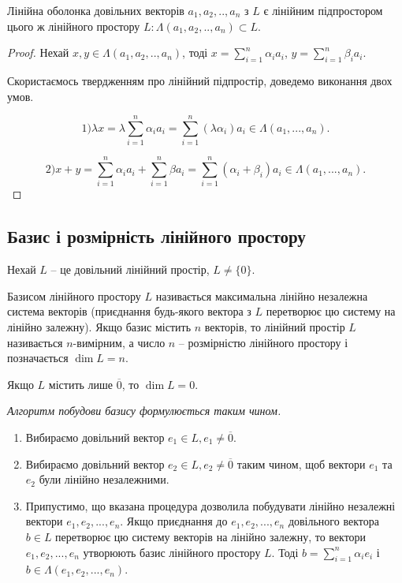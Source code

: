 \begin{claim}
	Лінійна оболонка довільних векторів $a_1, a_2, ..,a_n$ з $L$ є лінійним
	підпростором цього ж лінійного простору $L : \Lambda(a_1, a_2, ..,a_n) \subset L$.
\end{claim}
\begin{proof}
	Нехай $x, y \in \Lambda(a_1, a_2, ..,a_n)$, тоді $x = \sum\limits_{i=1}^n \alpha_i a_i$,
	$y = \sum\limits_{i=1}^n \beta_i a_i$.
	
	Скористаємось твердженням про лінійний підпростір, доведемо виконання
	двох умов.
	
	$$1) \lambda x = \lambda \sum\limits_{i=1}^n \alpha_i a_i = \sum\limits_{i=1}^n (\lambda \alpha_i) a_i \in \Lambda(a_1, ..., a_n).$$
	
	$$2) x+y = \sum\limits_{i=1}^n \alpha_i a_i + \sum\limits_{i=1}^n \beta a_i = \sum\limits_{i=1}^n (\alpha_i + \beta_i) a_i \in \Lambda(a_1, ..., a_n).$$
\end{proof}

\subsection{Базис і розмірність лінійного простору}

Нехай $L$ -- це довільний лінійний простір, $L \neq \{0\}$. 

\begin{definition}
	Базисом лінійного простору $L$ називається максимальна лінійно
	незалежна система векторів (приєднання будь-якого вектора з $L$ перетворює цю
	систему на лінійно залежну). Якщо базис містить $n$ векторів, то лінійний простір
	$L$ називається $n$-вимірним, а число $n$ -- розмірністю лінійного простору і
	позначається $\dim L = n$.
\end{definition}

\begin{remark}
	Якщо $L$ містить лише $\overline{0}$, то $\dim L = 0$.
\end{remark}

\textit{Алгоритм побудови базису формулюється таким чином.}
\begin{enumerate}
	\item Вибираємо довільний вектор $e_1 \in L, e_1 \neq \overline{0}$.
	
	\item Вибираємо довільний вектор $e_2 \in L, e_2 \neq \overline{0}$ таким чином, щоб вектори $e_1$ та
	$e_2$ були лінійно незалежними.
	
	\item Припустимо, що вказана процедура дозволила побудувати лінійно незалежні
	вектори $e_1, e_2, ..., e_n$. Якщо приєднання до $e_1, e_2, ..., e_n$ довільного вектора $b \in L$
	перетворює цю систему векторів на лінійно залежну, то вектори $e_1, e_2, ..., e_n$
	утворюють базис лінійного простору $L$. Тоді $b = \sum\limits_{i=1}^n \alpha_i e_i$ і $b \in \Lambda(e_1, e_2, ..., e_n)$.
\end{enumerate}

